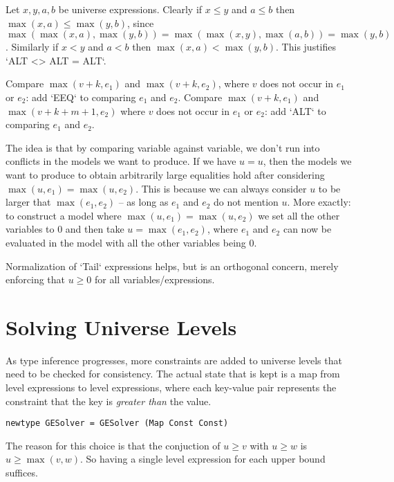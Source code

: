 \documentclass[11pt, twoside, reqno]{book}
\begin{document}
Let \(x, y, a, b\) be universe expressions.
Clearly if \(x \le y\) and \(a \le b\) then \(\max(x,a) \le \max(y,b)\), since \(\max(\max(x,a),\max(y,b)) = \max(\max(x,y),\max(a,b)) = \max(y,b)\).
Similarly if \(x < y\) and \(a < b\) then \(\max(x,a) < \max(y,b)\).
This justifies \inHS`ALT <> ALT = ALT`.

Compare \(\max(v+k, e_1)\) and \(\max(v+k, e_2)\), where \(v\) does not occur in \(e_1\) or \(e_2\): add \inHS`EEQ` to comparing \(e_1\) and \(e_2\).
Compare \(\max(v+k, e_1)\) and \(\max(v+k+m+1, e_2)\)  where \(v\) does not occur in \(e_1\) or \(e_2\): add \inHS`ALT` to comparing \(e_1\) and \(e_2\).


The idea is that by comparing variable against variable, we don't run into conflicts in the models we want to produce.
If we have \(u = u\), then the models we want to produce to obtain arbitrarily large equalities hold after considering \(\max(u, e_1) = \max(u, e_2)\).
This is because we can always consider \(u\) to be larger that \(\max(e_1, e_2)\) -- as long as \(e_1\) and \(e_2\) do not mention \(u\).
More exactly: to construct a model where \(\max(u, e_1) = \max(u, e_2)\) we set all the other variables to \(0\) and then take \(u = \max(e_1, e_2)\), where \(e_1\) and \(e_2\) can now be evaluated in the model with all the other variables being \(0\).

\begin{mdframed}[style=Note]
Normalization of \inHS`Tail` expressions helps, but is an orthogonal concern, merely enforcing that \(u \ge 0\) for all variables/expressions.
\end{mdframed}





\section{Solving Universe Levels}
\label{solv-uni-lvl}

As type inference progresses, more constraints are added to universe levels that need to be checked for consistency.
The actual state that is kept is a map from level expressions to level expressions, where each key-value pair represents the constraint that the key is \emph{greater than} the value.

\begin{verbatim}
newtype GESolver = GESolver (Map Const Const)
\end{verbatim}

The reason for this choice is that the conjuction of \(u \ge v\) with \(u \ge w\) is \(u \ge \max(v, w)\).
So having a single level expression for each upper bound suffices.
\end{document}
